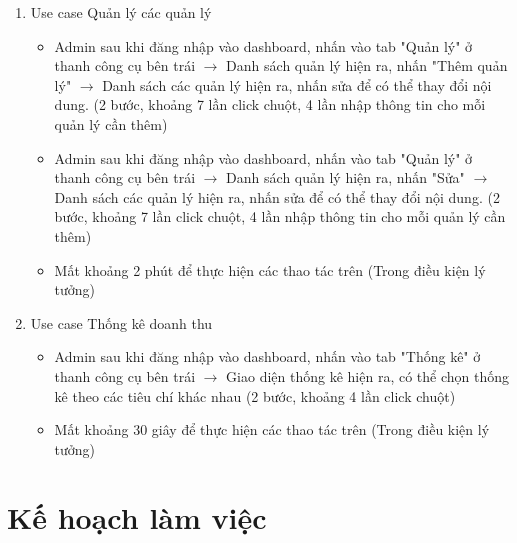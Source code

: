 \documentclass[a4paper, 12pt]{article}
\begin{document}
\begin{enumerate}
        \item Use case Quản lý các quản lý
        \begin{itemize}
            \item Admin sau khi đăng nhập vào dashboard, nhấn vào tab "Quản lý" ở thanh công cụ bên trái $\rightarrow$ Danh sách quản lý hiện ra, nhấn "Thêm quản lý" $\rightarrow$ Danh sách các quản lý hiện ra, nhấn sửa để có thể thay đổi nội dung. (2 bước, khoảng 7 lần click chuột, 4 lần nhập thông tin cho mỗi quản lý cần thêm)
            \item Admin sau khi đăng nhập vào dashboard, nhấn vào tab "Quản lý" ở thanh công cụ bên trái $\rightarrow$ Danh sách quản lý hiện ra, nhấn "Sửa" $\rightarrow$ Danh sách các quản lý hiện ra, nhấn sửa để có thể thay đổi nội dung. (2 bước, khoảng 7 lần click chuột, 4 lần nhập thông tin cho mỗi quản lý cần thêm)
            \item Mất khoảng 2 phút để thực hiện các thao tác trên (Trong điều kiện lý tưởng)
        \end{itemize}

        \item Use case Thống kê doanh thu
        \begin{itemize}
            \item Admin sau khi đăng nhập vào dashboard, nhấn vào tab "Thống kê" ở thanh công cụ bên trái $\rightarrow$ Giao diện thống kê hiện ra, có thể chọn thống kê theo các tiêu chí khác nhau (2 bước, khoảng 4 lần click chuột)
            \item Mất khoảng 30 giây để thực hiện các thao tác trên (Trong điều kiện lý tưởng)
        \end{itemize}
    \end{enumerate}
    \clearpage

    \section{Kế hoạch làm việc}
    \label{sec:plan}
\end{document}
